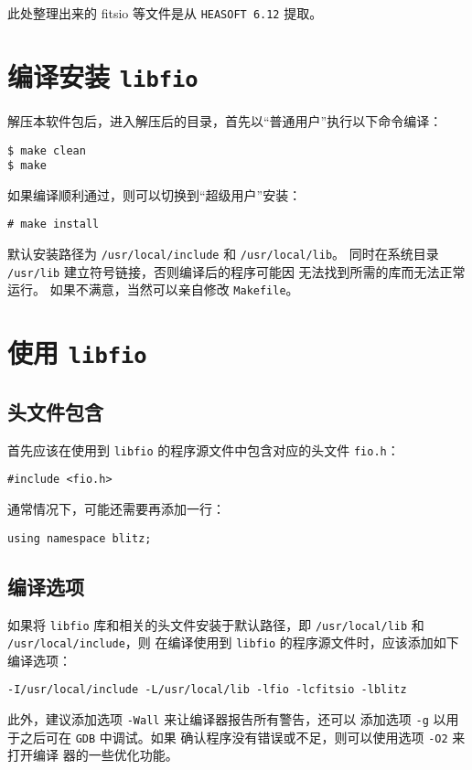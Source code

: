 \documentclass[a4paper,12pt]{article}
\begin{document}
此处整理出来的 fitsio 等文件是从 \texttt{HEASOFT 6.12} 提取。


\section{编译安装 \texttt{libfio}}
解压本软件包后，进入解压后的目录，首先以``普通用户''执行以下命令编译：
\begin{verbatim}
$ make clean
$ make
\end{verbatim}
如果编译顺利通过，则可以切换到``超级用户''安装：
\begin{verbatim}
# make install
\end{verbatim}
默认安装路径为 \texttt{/usr/local/include} 和 \texttt{/usr/local/lib}。
同时在系统目录 \texttt{/usr/lib} 建立符号链接，否则编译后的程序可能因
无法找到所需的库而无法正常运行。
如果不满意，当然可以亲自修改 \texttt{Makefile}。


\section{使用 \texttt{libfio}}

\subsection{头文件包含}
首先应该在使用到 \texttt{libfio} 的程序源文件中包含对应的头文件
\texttt{fio.h}：
\begin{verbatim}
#include <fio.h>
\end{verbatim}
通常情况下，可能还需要再添加一行：
\begin{verbatim}
using namespace blitz;
\end{verbatim}

\subsection{编译选项}
如果将 \texttt{libfio} 库和相关的头文件安装于默认路径，即
\texttt{/usr/local/lib} 和 \texttt{/usr/local/include}，则
在编译使用到 \texttt{libfio} 的程序源文件时，应该添加如下
编译选项：
\begin{verbatim}
-I/usr/local/include -L/usr/local/lib -lfio -lcfitsio -lblitz
\end{verbatim}
此外，建议添加选项 \texttt{-Wall} 来让编译器报告所有警告，还可以
添加选项 \texttt{-g} 以用于之后可在 \texttt{GDB} 中调试。如果
确认程序没有错误或不足，则可以使用选项 \texttt{-O2} 来打开编译
器的一些优化功能。
\end{document}
